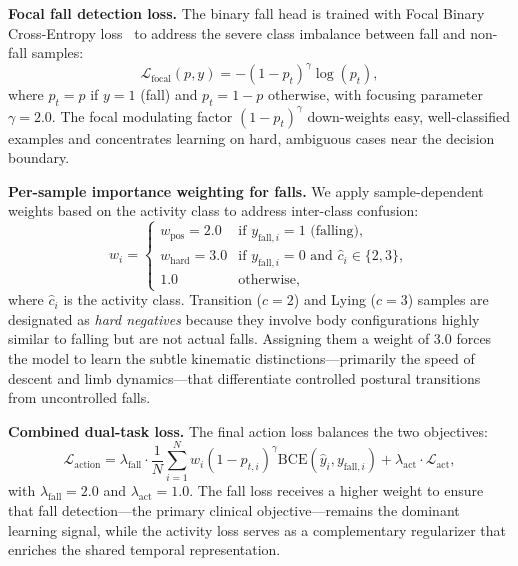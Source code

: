 \textbf{Focal fall detection loss.} The binary fall head is trained with Focal Binary Cross-Entropy loss~\cite{lin2017focal} to address the severe class imbalance between fall and non-fall samples:
\begin{equation}
    \mathcal{L}_\text{focal}(p, y) = -(1 - p_t)^\gamma \log(p_t),
    \label{eq:focal_bce}
\end{equation}
where $p_t = p$ if $y = 1$ (fall) and $p_t = 1 - p$ otherwise, with focusing parameter $\gamma = 2.0$. The focal modulating factor $(1 - p_t)^\gamma$ down-weights easy, well-classified examples and concentrates learning on hard, ambiguous cases near the decision boundary.

\textbf{Per-sample importance weighting for falls.} We apply sample-dependent weights based on the activity class to address inter-class confusion:
\begin{equation}
    w_i = \begin{cases}
        w_\text{pos} = 2.0 & \text{if } y_{\text{fall},i} = 1 \text{ (falling)}, \\
        w_\text{hard} = 3.0 & \text{if } y_{\text{fall},i} = 0 \text{ and } \hat{c}_i \in \{2, 3\}, \\
        1.0 & \text{otherwise},
    \end{cases}
    \label{eq:sample_weight}
\end{equation}
where $\hat{c}_i$ is the activity class. Transition ($c=2$) and Lying ($c=3$) samples are designated as \emph{hard negatives} because they involve body configurations highly similar to falling but are not actual falls. Assigning them a weight of 3.0 forces the model to learn the subtle kinematic distinctions---primarily the speed of descent and limb dynamics---that differentiate controlled postural transitions from uncontrolled falls.

\textbf{Combined dual-task loss.} The final action loss balances the two objectives:
\begin{equation}
    \mathcal{L}_\text{action} = \lambda_\text{fall} \cdot \frac{1}{N} \sum_{i=1}^{N} w_i (1 - p_{t,i})^\gamma \text{BCE}(\hat{y}_i, y_{\text{fall},i}) + \lambda_\text{act} \cdot \mathcal{L}_\text{act},
    \label{eq:action_loss_full}
\end{equation}
with $\lambda_\text{fall} = 2.0$ and $\lambda_\text{act} = 1.0$. The fall loss receives a higher weight to ensure that fall detection---the primary clinical objective---remains the dominant learning signal, while the activity loss serves as a complementary regularizer that enriches the shared temporal representation.

